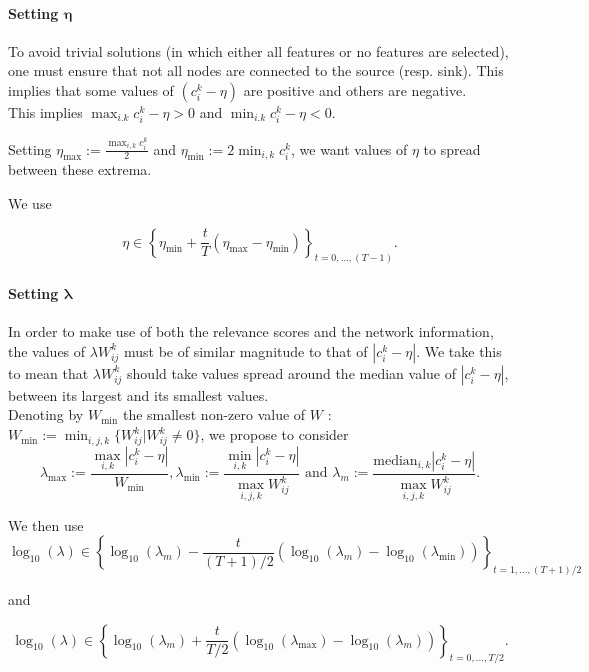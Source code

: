 \documentclass[12pt,a4paper]{article}
\begin{document}
\paragraph{Setting $\pmb{\eta}$} To avoid trivial solutions (in which either all features or no features are selected), one must ensure that not all nodes are connected to the source (resp. sink). This implies that some values of $(c_i^k - \eta)$ are positive and others are negative.\\

This implies $\max_{i. k} c_i^k - \eta > 0$ and $\min_{i. k} c_i^k - \eta < 0$. 

Setting $\eta_{\max} := \frac{\max_{i, k} c_i^k}{2}$ and $\eta_{\min} := 2 \min_{i, k} c_i^k$, we want values of $\eta$ to spread between these extrema.

We use 

\[\boxed{
\eta \in \left \{ {\eta_{\min} + \frac{t}{T} \left(\eta_{\max} - \eta_{\min} \right)    }   \right \}_{t = 0, \dots, (T-1)}}. 
\]

\paragraph{Setting $\pmb{\lambda}$} In order to make use of both the relevance scores and the network information, 
the values of $\lambda W_{ij}^k$ must be of similar magnitude to that of $|c_i^k - \eta|$. 
We take this to mean that $\lambda W_{ij}^k$ should take values spread around the median value of $|c_i^k - \eta|$, between its largest and its smallest values.\\

Denoting by $W_{\min}$ the smallest non-zero value of $W$ : 
$W_{\min} := \min_{i, j, k} \{ W_{ij}^k | W_{ij}^k \neq 0\}$,
we propose to consider 
\[
\lambda_{\max} := \frac{\max_{i,k} |c_i^k - \eta|}{W_{\min}}, 
\lambda_{\min} := \frac{\min_{i,k} |c_i^k - \eta|}{\max_{i,j,k}W_{ij}^k} \mbox{ and }
\lambda_{m} := \frac{\mbox{median}_{i, k} |c_i^k - \eta|}{\max_{i,j,k}W_{ij}^k}.
\]

 We then use 
\[\boxed{
\log_{10}(\lambda) \in \left \{ {\log_{10}(\lambda_{m}) - \frac{t}{(T+1)/2} 
 \left (\log_{10}(\lambda_{m}) - \log_{10}(\lambda_{\min}) \right)} \right \}_{t = 1, \dots, (T+1)/2}}
\]

 and

\[\boxed{
\log_{10}(\lambda) \in \left \{ {\log_{10}(\lambda_{m}) + \frac{t}{T/2} 
\left (\log_{10}(\lambda_{\max}) - \log_{10}(\lambda_{m}) \right)} \right \}_{t = 0, \dots, T/2}}.
\]
\end{document}

